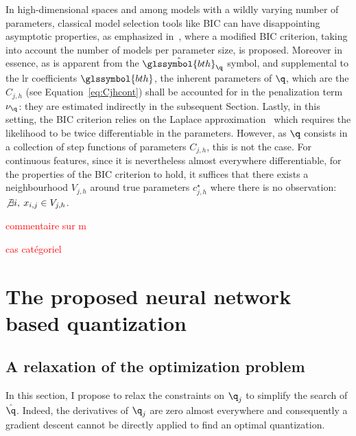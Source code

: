 In high-dimensional spaces and among models with a wildly varying number of parameters, classical model selection tools like BIC can have disappointing asymptotic properties, as emphasized in~\cite{chen2008extended}, where a modified BIC criterion, taking into account the number of models per parameter size, is proposed.
Moreover in essence, as is apparent from the $\hat{\glssymbol{bth}}_\q$ symbol, and supplemental to the \gls{lr} coefficients $\glssymbol{bth}$, the inherent parameters of $\q$, which are the $C_{j,h}$ (see Equation~\eqref{eq:Cjhcont}) shall be accounted for in the penalization term $\nu_\q$: they are estimated indirectly in the subsequent Section.
Lastly, in this setting, the BIC criterion relies on the Laplace approximation~\cite{lebarbier} which requires the likelihood to be twice differentiable in the parameters. However, as $\q$ consists in a collection of step functions of parameters $C_{j,h}$, this is not the case. For continuous features, since it is nevertheless almost everywhere differentiable, for the properties of the BIC criterion to hold, it suffices that there exists a neighbourhood $V_{j,h}$ around true parameters $c_{j,h}^\star$ where there is no observation: $\not\exists i, \: x_{i,j} \in V_{j,h}$.

\textcolor{red}{commentaire sur m}

\textcolor{red}{cas catégoriel}


\section{The proposed neural network based quantization}
\label{sec:proposal}

\subsection{A relaxation of the optimization problem} \label{subsec:relaxation}

In this section, I propose to relax the constraints on $\q_j$ to simplify the search of $\hat{\q}$. Indeed, the derivatives of $\q_j$ are zero almost everywhere and consequently a gradient descent cannot be directly applied to find an optimal quantization.


